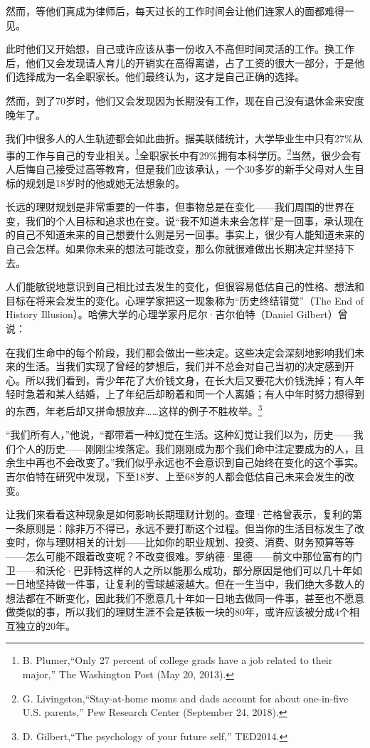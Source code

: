 然而，等他们真成为律师后，每天过长的工作时间会让他们连家人的面都难得一见。

此时他们又开始想，自己或许应该从事一份收入不高但时间灵活的工作。换工作后，他们又会发现请人育儿的开销实在高得离谱，占了工资的很大一部分，于是他们选择成为一名全职家长。他们最终认为，这才是自己正确的选择。

然而，到了70岁时，他们又会发现因为长期没有工作，现在自己没有退休金来安度晚年了。

我们中很多人的人生轨迹都会如此曲折。据美联储统计，大学毕业生中只有27\%从事的工作与自己的专业相关。\footnote{B. Plumer,“Only 27 percent of college grads have a job related to their major,” The Washington Post (May 20, 2013).}全职家长中有29\%拥有本科学历。\footnote{G. Livingston,“Stay-at-home moms and dads account for about one-in-five U.S. parents,” Pew Research Center (September 24, 2018).}当然，很少会有人后悔自己接受过高等教育，但是我们应该承认，一个30多岁的新手父母对人生目标的规划是18岁时的他或她无法想象的。

长远的理财规划是非常重要的一件事，但事物总是在变化——我们周围的世界在变，我们的个人目标和追求也在变。说“我不知道未来会怎样”是一回事，承认现在的自己不知道未来的自己想要什么则是另一回事。事实上，很少有人能知道未来的自己会怎样。如果你未来的想法可能改变，那么你就很难做出长期决定并坚持下去。

人们能敏锐地意识到自己相比过去发生的变化，但很容易低估自己的性格、想法和目标在将来会发生的变化。心理学家把这一现象称为“历史终结错觉”（The End of History Illusion）。哈佛大学的心理学家丹尼尔·吉尔伯特（Daniel Gilbert）曾说：

{\kaishu

在我们生命中的每个阶段，我们都会做出一些决定。这些决定会深刻地影响我们未来的生活。当我们实现了曾经的梦想后，我们并不总会对自己当初的决定感到开心。所以我们看到，青少年花了大价钱文身，在长大后又要花大价钱洗掉；有人年轻时急着和某人结婚，上了年纪后却盼着和同一个人离婚；有人中年时努力想得到的东西，年老后却又拼命想放弃……这样的例子不胜枚举。\footnote{D. Gilbert,“The psychology of your future self,” TED2014.}

}

“我们所有人，”他说，“都带着一种幻觉在生活。这种幻觉让我们以为，历史——我们个人的历史——刚刚尘埃落定。我们刚刚成为那个我们命中注定要成为的人，且余生中再也不会改变了。”我们似乎永远也不会意识到自己始终在变化的这个事实。吉尔伯特在研究中发现，下至18岁、上至68岁的人都会低估自己未来会发生的改变。

让我们来看看这种现象是如何影响长期理财计划的。查理·芒格曾表示，复利的第一条原则是：除非万不得已，永远不要打断这个过程。但当你的生活目标发生了改变时，你与理财相关的计划——比如你的职业规划、投资、消费、财务预算等等——怎么可能不跟着改变呢？不改变很难。罗纳德·里德——前文中那位富有的门卫——和沃伦·巴菲特这样的人之所以能那么成功，部分原因是他们可以几十年如一日地坚持做一件事，让复利的雪球越滚越大。但在一生当中，我们绝大多数人的想法都在不断变化，因此我们不愿意几十年如一日地去做同一件事，甚至也不愿意做类似的事，所以我们的理财生涯不会是铁板一块的80年，或许应该被分成4个相互独立的20年。

